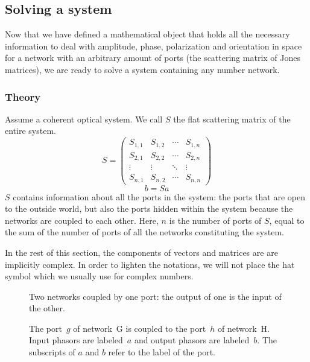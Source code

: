 \subsection{Solving a system}
\label{sec:solving_a_system}
Now that we have defined a mathematical object that holds all the necessary information to deal with amplitude, phase, polarization and orientation in space for a network with an arbitrary amount of ports (the scattering matrix of Jones matrices), we are ready to solve a system containing any number network.

\subsubsection{Theory}

Assume a coherent optical system.
We call $S$ the flat scattering matrix of the entire system.
\begin{equation*}
    S =
    \begin{pmatrix}
        S_{1, 1} & S_{1, 2} & \cdots & S_{1, n} \\
        S_{2, 1} & S_{2, 2} & \cdots & S_{2, n} \\
        \vdots   & \vdots   & \ddots & \vdots \\
        S_{n, 1} & S_{n, 2} & \cdots & S_{n, n}
    \end{pmatrix}
\end{equation*}
\begin{equation*}
    b = Sa
\end{equation*}
$S$ contains information about all the ports in the system: the ports that are open to the outside world, but also the ports hidden within the system because the networks are coupled to each other.
Here, $n$ is the number of ports of $S$, equal to the sum of the number of ports of all the networks constituting the system.

In the rest of this section, the components of vectors and matrices are are implicitly complex.
In order to lighten the notations, we will not place the hat symbol which we usually use for complex numbers.

\begin{figure}[hbtp]
    \centering
    
    \caption{Two networks coupled by one port: the output of one is the input of the other.}
    \caption*{
        The port~$g$ of network~G is coupled to the port~$h$ of network~H.
        Input phasors are labeled~$a$ and output phasors are labeled~$b$.
        The subscripts of $a$ and $b$ refer to the label of the port.
    }
    \label{fig:output_g_is_input_h}
\end{figure}

